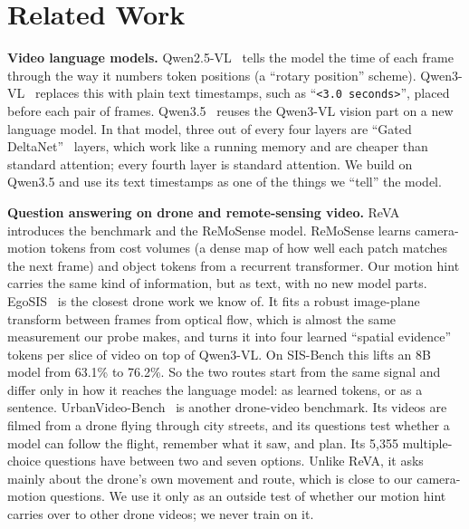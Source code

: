 \section{Related Work}
\label{sec:related}

\textbf{Video language models.} Qwen2.5-VL~\cite{qwen25vl2025} tells the
model the time of each frame through the way it numbers token positions
(a ``rotary position'' scheme). Qwen3-VL~\cite{qwen3vl2025} replaces this
with plain text timestamps, such as ``\texttt{<3.0 seconds>}'', placed
before each pair of frames. Qwen3.5~\cite{qwen35} reuses the Qwen3-VL
vision part on a new language model. In that model, three out of every four
layers are ``Gated DeltaNet''~\cite{yang2025gdn} layers, which work like a
running memory and are cheaper than standard attention; every fourth layer
is standard attention. We build on Qwen3.5 and use its text timestamps as
one of the things we ``tell'' the model.

\textbf{Question answering on drone and remote-sensing video.}
ReVA~\cite{yao2026reva} introduces the benchmark and the ReMoSense model.
ReMoSense learns camera-motion tokens from cost volumes (a dense map of how
well each patch matches the next frame) and object tokens from a recurrent
transformer. Our motion hint carries the same kind of information, but as
text, with no new model parts. EgoSIS~\cite{yang2026egosis} is the closest
drone work we know of. It fits a robust image-plane transform between frames
from optical flow, which is almost the same measurement our probe makes, and
turns it into four learned ``spatial evidence'' tokens per slice of video on
top of Qwen3-VL. On SIS-Bench this lifts an 8B model from 63.1\% to 76.2\%.
So the two routes start from the same signal and differ only in how it
reaches the language model: as learned tokens, or as a sentence.
UrbanVideo-Bench~\cite{zhao2025urbanvideo}
is another drone-video benchmark. Its videos are filmed from a drone flying
through city streets, and its questions test whether a model can follow
the flight, remember what it saw, and plan. Its 5,355 multiple-choice
questions have between two and seven options. Unlike ReVA, it asks mainly
about the drone's own movement and route, which is close to our
camera-motion questions. We use it only as an outside test of whether our
motion hint carries over to other drone videos; we never train on it.

